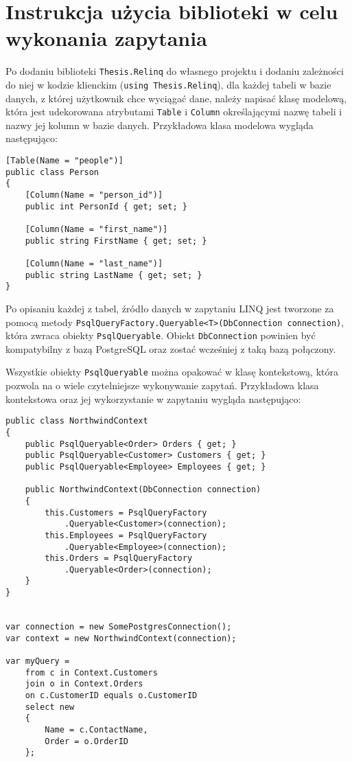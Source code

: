 \chapter{Instrukcja użycia biblioteki w celu wykonania zapytania}
Po dodaniu biblioteki \texttt{Thesis.Relinq} do własnego projektu i dodaniu zależności do niej w kodzie klienckim (\texttt{using Thesis.Relinq}), dla każdej tabeli w bazie danych, z której użytkownik chce wyciągać dane, należy napisać klasę modelową, która jest udekorowana atrybutami \texttt{Table} i \texttt{Column} określającymi nazwę tabeli i nazwy jej kolumn w bazie danych. Przykładowa klasa modelowa wygląda następująco:

\begin{lstlisting}
[Table(Name = "people")]
public class Person
{
    [Column(Name = "person_id")]
    public int PersonId { get; set; }

    [Column(Name = "first_name")]
    public string FirstName { get; set; }

    [Column(Name = "last_name")]
    public string LastName { get; set; }
}
\end{lstlisting}

Po opisaniu każdej z tabel, źródło danych w zapytaniu LINQ jest tworzone za pomocą metody \texttt{PsqlQueryFactory.Queryable<T>(DbConnection connection)}, która zwraca obiekty \texttt{PsqlQueryable}. Obiekt \texttt{DbConnection} powinien być kompatybilny z bazą PostgreSQL oraz zostać wcześniej z taką bazą połączony.

Wszystkie obiekty \texttt{PsqlQueryable} można opakować w klasę kontekstową, która pozwola na o wiele czytelniejsze wykonywanie zapytań. Przykładowa klasa kontekstowa oraz jej wykorzystanie w zapytaniu wygląda następująco:

\pagebreak

\begin{lstlisting}
public class NorthwindContext
{
    public PsqlQueryable<Order> Orders { get; }
    public PsqlQueryable<Customer> Customers { get; }
    public PsqlQueryable<Employee> Employees { get; }

    public NorthwindContext(DbConnection connection)
    {
        this.Customers = PsqlQueryFactory
            .Queryable<Customer>(connection);
        this.Employees = PsqlQueryFactory
            .Queryable<Employee>(connection);
        this.Orders = PsqlQueryFactory
            .Queryable<Order>(connection);
    }
}


var connection = new SomePostgresConnection();
var context = new NorthwindContext(connection);

var myQuery =
    from c in Context.Customers
    join o in Context.Orders
    on c.CustomerID equals o.CustomerID
    select new
    {
        Name = c.ContactName,
        Order = o.OrderID
    };
\end{lstlisting}